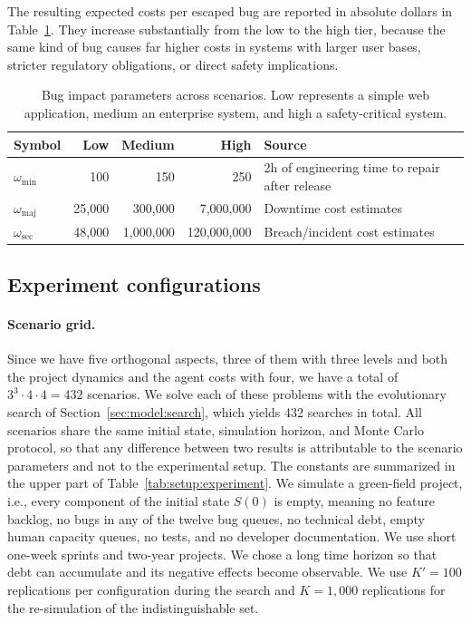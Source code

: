 \documentclass[smallextended]{svjour3}       %
\begin{document}
The resulting expected costs per escaped bug are reported in absolute dollars in Table~\ref{tab:scenario:bugimpact}. They increase substantially from the low to the high tier, because the same kind of bug causes far higher costs in systems with larger user bases, stricter regulatory obligations, or direct safety implications.


\begin{table}[t]
\caption{Bug impact parameters across scenarios. Low represents a simple web application, medium an enterprise system, and high a safety-critical system.}
\label{tab:scenario:bugimpact}
\footnotesize
\begin{tabularx}{\linewidth}{p{1.8cm}rrrX}
\toprule
Symbol & Low & Medium & High & Source \\
\midrule
$\omega_\mathrm{min}$ &      100 &      150 &      250 & 2h of engineering time to repair after release \\[2pt]
$\omega_\mathrm{maj}$ & 25{,}000 & 300{,}000 & 7{,}000{,}000 & Downtime cost estimates~\citep{itic2026downtime,cloudqa2026bugcost,mckinsey2026medtech,meddeviceguide2026recalls} \\[2pt]
$\omega_\mathrm{sec}$ & 48{,}000 & 1{,}000{,}000 & 120{,}000{,}000 & Breach/incident cost estimates~\citep{cisa2020cybercost,nhe2018wannacry} \\
\bottomrule
\end{tabularx}
\end{table}


\subsection{Experiment configurations}
\label{sec:setup:sweep}

\paragraph{Scenario grid.}
Since we have five orthogonal aspects, three of them with three levels and both the project dynamics and the agent costs with four, we have a total of $3^3 \cdot 4 \cdot 4 = 432$ scenarios. We solve each of these problems with the evolutionary search of Section~\ref{sec:model:search}, which yields 432 searches in total.
All scenarios share the same initial state, simulation horizon, and Monte Carlo protocol, so that any difference between two results is attributable to the scenario parameters and not to the experimental setup. The constants are summarized in the upper part of Table~\ref{tab:setup:experiment}. We simulate a green-field project, i.e., every component of the initial state $S(0)$ is empty, meaning no feature backlog, no bugs in any of the twelve bug queues, no technical debt, empty human capacity queues, no tests, and no developer documentation. We use short one-week sprints and two-year projects. We chose a long time horizon so that debt can accumulate and its negative effects become observable. We use $K' = 100$ replications per configuration during the search and $K = 1{,}000$ replications for the re-simulation of the indistinguishable set. 
\end{document}
